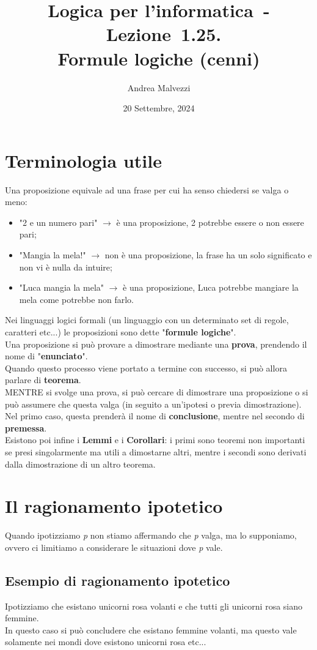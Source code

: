 \documentclass[12pt]{article}
\author{Andrea Malvezzi}
\title{\textbf{Logica per l'informatica~-~Lezione~1.25.\\Formule logiche (cenni)}}
\date{20 Settembre, 2024}
\begin{document}
\maketitle
\pagebreak
\tableofcontents
\pagebreak
\section{Terminologia utile}
Una proposizione equivale ad una frase per cui ha senso chiedersi se valga o meno:
\begin{itemize}
    \item "2 e un numero pari" $\rightarrow$ è una proposizione, 2 potrebbe essere o non essere pari;
    \item "Mangia la mela!" $\rightarrow$ non è una proposizione, la frase ha un solo significato e non vi è nulla da intuire;
    \item "Luca mangia la mela" $\rightarrow$ è una proposizione, Luca potrebbe mangiare la mela come potrebbe non farlo.
\end{itemize}
Nei linguaggi logici formali (un linguaggio con un determinato set di regole, caratteri etc...) le proposizioni sono dette "\textbf{formule logiche}".\\
Una proposizione si può provare a dimostrare mediante una \textbf{prova}, prendendo il nome di "\textbf{enunciato}".\\
Quando questo processo viene portato a termine con successo, si può allora parlare di \textbf{teorema}.\\
MENTRE si svolge una prova, si può cercare di dimostrare una proposizione o si può assumere che questa valga (in seguito a un'ipotesi o previa dimostrazione).\\
Nel primo caso, questa prenderà il nome di \textbf{conclusione}, mentre nel secondo di \textbf{premessa}.\\
Esistono poi infine i \textbf{Lemmi} e i \textbf{Corollari}: i primi sono teoremi non importanti se presi singolarmente ma utili a dimostarne altri, mentre i secondi sono derivati dalla dimostrazione di un altro teorema. 
\section{Il ragionamento ipotetico}
Quando ipotizziamo \textit{p} non stiamo affermando che \textit{p} valga, ma lo supponiamo, ovvero ci limitiamo a considerare le situazioni dove \textit{p} vale.
\subsection*{Esempio di ragionamento ipotetico}
Ipotizziamo che esistano unicorni rosa volanti e che tutti gli unicorni rosa siano femmine.\\
In questo caso si può concludere che esistano femmine volanti, ma questo vale solamente nei mondi dove esistono unicorni rosa etc... 
\end{document}
